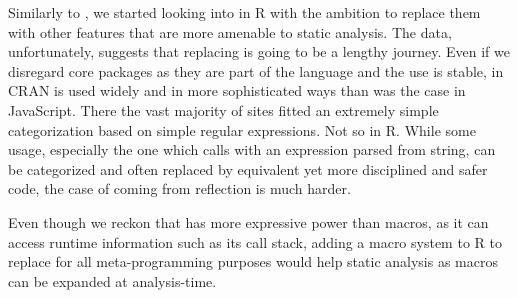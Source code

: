 \documentclass[review,screen,acmsmall,anonymous=true]{acmart}
\begin{document}
Similarly to \citep{ecoop11}, we started looking into \evals in R with the
ambition to replace them with other features that are more amenable to static
analysis. The data, unfortunately, suggests that replacing \eval is going to be
a lengthy journey. Even if we disregard core packages as they are part of the
language and the \eval use is stable, in CRAN \eval is used widely and in more
sophisticated ways than was the case in JavaScript. There the vast majority of
sites fitted an extremely simple categorization based on simple regular
expressions. Not so in R. While some usage, especially the one which calls
\eval with an expression parsed from string, can be categorized and often
replaced by equivalent yet more disciplined and safer code, the case of \eval
coming from reflection is much harder.

Even though we reckon that \eval has more expressive power than macros, as it can access runtime information such as its call stack, adding a macro system to R to replace \eval for all meta-programming purposes would help static analysis as macros can be expanded at analysis-time.



\end{document}
